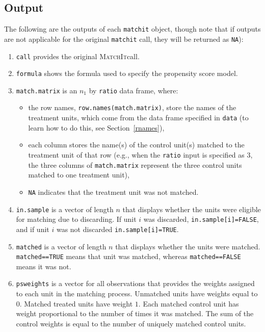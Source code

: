\documentclass[oneside,letterpaper,titlepage]{article}
\newcommand{\MatchIt}{\textsc{MatchIt}}
\begin{document}
\subsection{Output}

The following are the outputs of each \texttt{matchit} object, though
note that if outputs are not applicable for the original
\texttt{matchit} call, they will be returned as \texttt{NA}):

\begin{enumerate}

\item \texttt{call} provides the original \MatchIt call.
 
\item \texttt{formula} shows the formula used to specify the propensity score model.

\item \texttt{match.matrix} is an $n_1$ by \texttt{ratio} data frame,
  where:

  \begin{itemize}
  \item the row names, \texttt{row.names(match.matrix)}, store the
    names of the treatment units, which come from the data frame
    specified in \texttt{data} (to learn how to do this, see
    Section~\ref{rnames}),
  \item each column stores the name(s) of the control unit(s) matched
    to the treatment unit of that row (e.g., when the \texttt{ratio}
    input is specified as 3, the three columns of
    \texttt{match.matrix} represent the three control units matched to
    one treatment unit),
   \item \texttt{NA} indicates that the treatment unit was not
     matched.  
   \end{itemize}
   
 \item \texttt{in.sample} is a vector of length $n$ that displays
   whether the units were eligible for matching due to discarding.  If
   unit $i$ was discarded, \texttt{in.sample[i]=FALSE}, and if unit
   $i$ was not discarded \texttt{in.sample[i]=TRUE}.
   
 \item \texttt{matched} is a vector of length $n$ that displays
   whether the units were matched.  \texttt{matched==TRUE} means that
   unit was matched, whereas \texttt{matched==FALSE} means it was not.
   
 \item \texttt{psweights} is a vector for all observations that
   provides the weights assigned to each unit in the matching process.
   Unmatched units have weights equal to $0$. Matched treated units
   have weight $1$.  Each matched control unit has weight proportional
   to the number of times it was matched.  The sum of the control
   weights is equal to the number of uniquely matched control units.
   

\end{enumerate}
\end{document}
